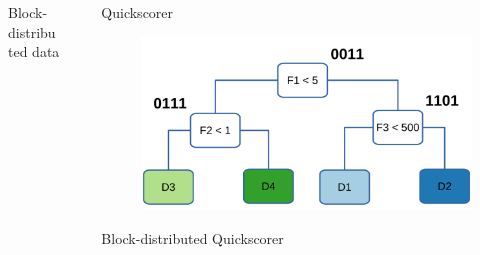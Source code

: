 \documentclass[final]{beamer}
\newlength{\sepwid}
\newlength{\onecolwid}
\begin{document}
\begin{frame}[t]
\begin{columns}[t]
\begin{column}{\onecolwid}
\begin{block}{Block-distributed data}
\begin{figure}
		\label{fig:grad-row-dist}
	\end{figure}
	
	
\end{block}





\end{column} %

\begin{column}{\sepwid}\end{column} %

\begin{column}{\onecolwid} %
	
	
	
	\begin{block}{Quickscorer}
		
		\begin{figure}
			\includegraphics[width=\onecolwid]{decision_tree_bitstrings}
			\label{fig:quickscorer}
		\end{figure}
		
	\end{block}

	\begin{block}{Block-distributed Quickscorer}
		

\end{block}
\end{column}
\end{columns}
\end{frame}
\end{document}
